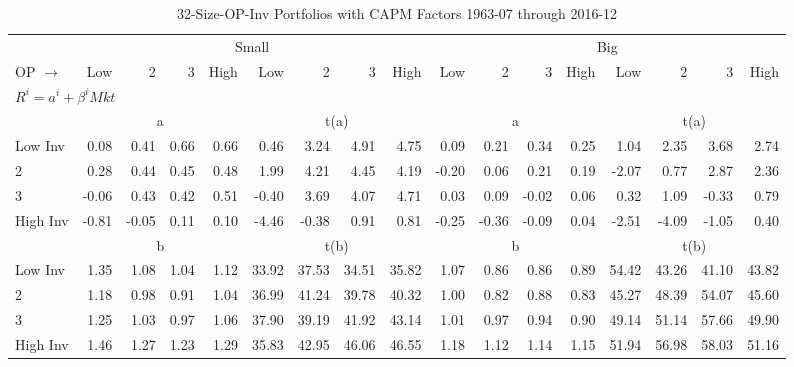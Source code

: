 
\begin{table}[!ht]
\centering
\caption{32-Size-OP-Inv Portfolios with CAPM Factors 1963-07 through 2016-12}
\begin{tabular}{lrrrrrrrrrrrrrrrr}
  \toprule
    & \multicolumn{8}{c}{Small} & \multicolumn{8}{c}{Big} \\
      \cmidrule(r){2-9} \cmidrule(r){10-17}
    OP $\rightarrow$ & Low & 2 & 3 & High & Low & 2 & 3 & High & Low & 2 & 3 & High & Low & 2 & 3 & High \\ 
  \midrule
  \multicolumn{17}{l}{$R^i=a^i+\beta^iMkt$} \\

  
    
      & \multicolumn{4}{c}{a} & \multicolumn{4}{c}{t(a)}
    
      & \multicolumn{4}{c}{a} & \multicolumn{4}{c}{t(a)}
    
    \\
      \cmidrule(r){2-5} \cmidrule(r){6-9} \cmidrule(r){10-13} \cmidrule(r){14-17}

    Low Inv   & 0.08  & 0.41  & 0.66  & 0.66  & 0.46  & 3.24  & 4.91  & 4.75  & 0.09  & 0.21  & 0.34  & 0.25  & 1.04  & 2.35  & 3.68  & 2.74  \\
           2  & 0.28  & 0.44  & 0.45  & 0.48  & 1.99  & 4.21  & 4.45  & 4.19  & -0.20  & 0.06  & 0.21  & 0.19  & -2.07  & 0.77  & 2.87  & 2.36  \\
           3  & -0.06  & 0.43  & 0.42  & 0.51  & -0.40  & 3.69  & 4.07  & 4.71  & 0.03  & 0.09  & -0.02  & 0.06  & 0.32  & 1.09  & -0.33  & 0.79  \\
    High Inv  & -0.81  & -0.05  & 0.11  & 0.10  & -4.46  & -0.38  & 0.91  & 0.81  & -0.25  & -0.36  & -0.09  & 0.04  & -2.51  & -4.09  & -1.05  & 0.40  \\

  
    
      & \multicolumn{4}{c}{b} & \multicolumn{4}{c}{t(b)}
    
      & \multicolumn{4}{c}{b} & \multicolumn{4}{c}{t(b)}
    
    \\
      \cmidrule(r){2-5} \cmidrule(r){6-9} \cmidrule(r){10-13} \cmidrule(r){14-17}

    Low Inv   & 1.35  & 1.08  & 1.04  & 1.12  & 33.92  & 37.53  & 34.51  & 35.82  & 1.07  & 0.86  & 0.86  & 0.89  & 54.42  & 43.26  & 41.10  & 43.82  \\
           2  & 1.18  & 0.98  & 0.91  & 1.04  & 36.99  & 41.24  & 39.78  & 40.32  & 1.00  & 0.82  & 0.88  & 0.83  & 45.27  & 48.39  & 54.07  & 45.60  \\
           3  & 1.25  & 1.03  & 0.97  & 1.06  & 37.90  & 39.19  & 41.92  & 43.14  & 1.01  & 0.97  & 0.94  & 0.90  & 49.14  & 51.14  & 57.66  & 49.90  \\
    High Inv  & 1.46  & 1.27  & 1.23  & 1.29  & 35.83  & 42.95  & 46.06  & 46.55  & 1.18  & 1.12  & 1.14  & 1.15  & 51.94  & 56.98  & 58.03  & 51.16  \\

  

  \bottomrule
\end{tabular}
\label{tbl:32_Size_OP_Inv_CAPM}
\end{table}